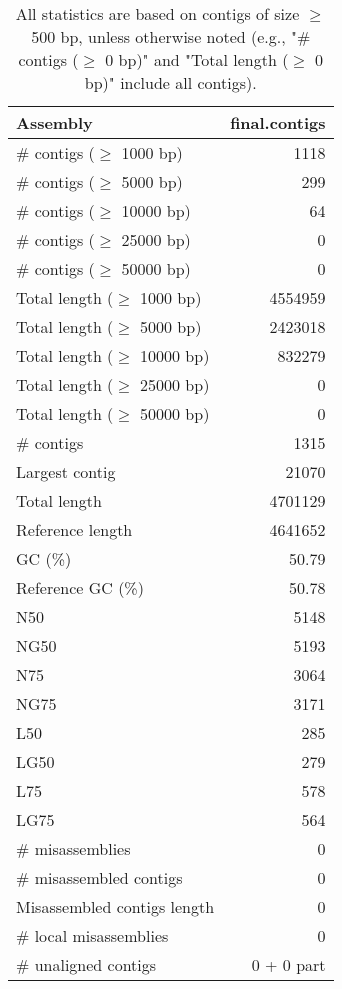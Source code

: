 \documentclass[12pt,a4paper]{article}
\begin{document}
\begin{table}[ht]
\begin{center}
\caption{All statistics are based on contigs of size $\geq$ 500 bp, unless otherwise noted (e.g., "\# contigs ($\geq$ 0 bp)" and "Total length ($\geq$ 0 bp)" include all contigs).}
\begin{tabular}{|l*{1}{|r}|}
\hline
Assembly & final.contigs \\ \hline
\# contigs ($\geq$ 1000 bp) & 1118 \\ \hline
\# contigs ($\geq$ 5000 bp) & 299 \\ \hline
\# contigs ($\geq$ 10000 bp) & 64 \\ \hline
\# contigs ($\geq$ 25000 bp) & 0 \\ \hline
\# contigs ($\geq$ 50000 bp) & 0 \\ \hline
Total length ($\geq$ 1000 bp) & 4554959 \\ \hline
Total length ($\geq$ 5000 bp) & 2423018 \\ \hline
Total length ($\geq$ 10000 bp) & 832279 \\ \hline
Total length ($\geq$ 25000 bp) & 0 \\ \hline
Total length ($\geq$ 50000 bp) & 0 \\ \hline
\# contigs & 1315 \\ \hline
Largest contig & 21070 \\ \hline
Total length & 4701129 \\ \hline
Reference length & 4641652 \\ \hline
GC (\%) & 50.79 \\ \hline
Reference GC (\%) & 50.78 \\ \hline
N50 & 5148 \\ \hline
NG50 & 5193 \\ \hline
N75 & 3064 \\ \hline
NG75 & 3171 \\ \hline
L50 & 285 \\ \hline
LG50 & 279 \\ \hline
L75 & 578 \\ \hline
LG75 & 564 \\ \hline
\# misassemblies & 0 \\ \hline
\# misassembled contigs & 0 \\ \hline
Misassembled contigs length & 0 \\ \hline
\# local misassemblies & 0 \\ \hline
\# unaligned contigs & 0 + 0 part \\ \hline

\end{tabular}
\end{center}
\end{table}
\end{document}
